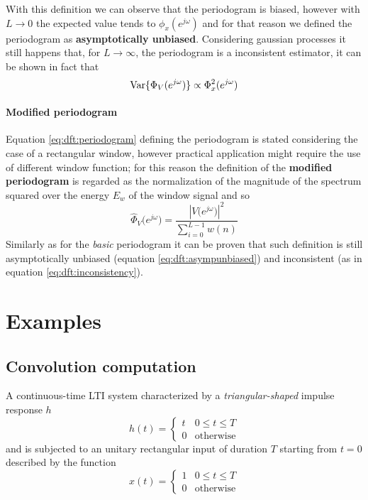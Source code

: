 		With this definition we can observe that the periodogram is biased, however with $L\rightarrow 0$ the expected value tends to $\phi_x(e^{j\omega})$ and for that reason we defined the periodogram as \textbf{asymptotically unbiased}. Considering gaussian processes it still happens that, for $L\rightarrow \infty$, the periodogram is a inconsistent estimator, it can be shown in fact that
		\begin{equation} \label{eq:dft:inconsistency}
			\textrm{Var}\{\Phi_V (e^{j\omega})\} \propto \Phi_x^2(e^{j\omega})
		\end{equation}
		
		\paragraph{Modified periodogram} Equation \ref{eq:dft:periodogram} defining the periodogram is stated considering the case of a rectangular window, however practical application might require the use of different window function; for this reason the definition of the \textbf{modified periodogram} is regarded as the normalization of the magnitude of the spectrum squared over the energy $E_w$ of the window signal and so
		\begin{equation}
			\hat \Phi_V \big(e^{j\omega}\big) = \frac{\left| V\big(e^{j\omega}\big) \right|^2}{\sum_{i=0}^{L-1} w(n) }
		\end{equation}		
		Similarly as for the \textit{basic} periodogram it can be proven that such definition is still asymptotically unbiased (equation \ref{eq:dft:asympunbiased}) and inconsistent (as in equation \ref{eq:dft:inconsistency}).
		

\section{Examples}
	\subsection{Convolution computation}
		A continuous-time LTI system characterized by a \textit{triangular-shaped} impulse response $h$
		\[ h(t) = \begin{cases}
			t & 0\leq t\leq T \\ 0 & \textrm{otherwise}
		\end{cases} \]
		and is subjected to an unitary rectangular input of duration $T$ starting from $t=0$ described by the function
		\[ x(t) = \begin{cases}
			1 & 0\leq t\leq T \\ 0 & \textrm{otherwise}
		\end{cases} \]
		
